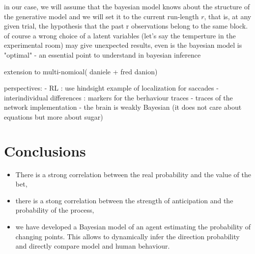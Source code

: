 \documentclass[profile,final,english, draft]{article}%
\newcommand{\citep}[1]{(\cite{#1})}
\begin{document}
in our case, we will assume that the bayesian model knows about the structure of the generative model and we will set it to the current run-length $r$, that is, at any given trial, the hypothesis that the past r observations belong to the same block. of course a wrong choice of a latent variables (let's say the temperture in the experimental room) may give unexpected results, even is the bayesian model is "optimal" - an essential point to understand in bayesian inference

extension to multi-nomioal( daniele + fred danion)





perspectives:
- RL : use hindsight example of localization for saccades
- interindividual differences : markers for the berhaviour traces - traces of the network implementation
- the brain is weakly Bayesian (it does not care about equations but more about sugar)



\section{Conclusions}


\begin{itemize}\setlength{\itemsep}{0ex}
\item There is a strong correlation between the real probability and the value of the bet,

\item there is a stong correlation between the strength of anticipation and the probability of the process,

\item we have developed a Bayesian model of an agent estimating the probability of changing points. This allows to dynamically infer the direction probability and directly compare model and human behaviour.

\end{itemize}

{\tiny
\printbibliography
}
\end{document}
